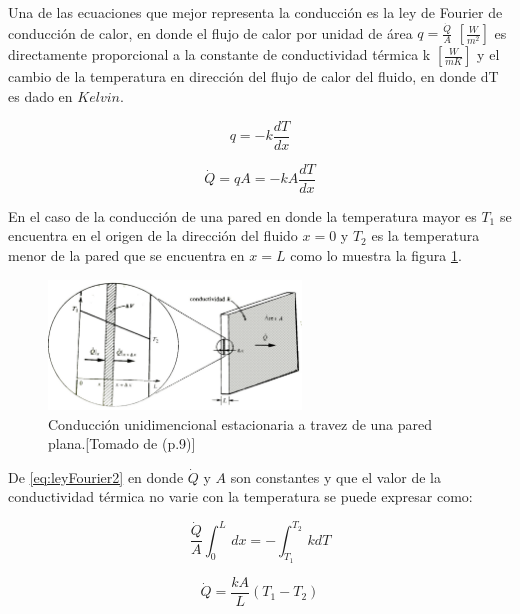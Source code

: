\documentclass[12pt,letterpaper]{article}     %
\begin{document}
Una de las ecuaciones que mejor representa la conducción es la ley de Fourier de conducción de calor, en donde el flujo de calor por unidad de área $q = \frac{\dot{Q}}{A}$ $[\frac{W}{m^2}]$ es directamente proporcional a la constante de conductividad térmica k $[\frac{W}{mK}]$ y el cambio de la temperatura en dirección del flujo de calor del fluido, en donde dT es dado en $Kelvin$. 

\begin{equation}
    q = -k\frac{dT}{dx} 
    \label{eq:leyFourier1}
\end{equation}

\begin{equation}
    \dot{Q} = q A = -k A \frac{dT}{dx} 
    \label{eq:leyFourier2}
\end{equation}

En el caso de la conducción de una pared en donde la temperatura mayor es $T_{1}$ se encuentra en el origen de la dirección del fluido $x=0$ y $T_{2}$ es la temperatura menor de la pared que se encuentra en $x=L$ como lo muestra la figura \ref{fig:cond-paredplana}. 

\begin{figure}[H]
\centering
\includegraphics[width=0.6\textwidth]{Imagines/coduccion1pared-nuevo.jpg}
\caption{Conducción unidimencional estacionaria a travez de una pared plana.[Tomado de \cite{Mills} (p.9)]}
\label{fig:cond-paredplana}
\end{figure}

De \ref{eq:leyFourier2} en donde $\dot{Q}$ y $A$ son constantes y que el valor de la conductividad térmica no varie con la temperatura se puede expresar como:



\begin{equation}
    \frac{\dot{Q}}{A}\displaystyle\int_{0}^{L}\, dx = -\displaystyle\int_{T_{1}}^{T_{2}}\,k dT
    \label{eq:intleyFourier1}
\end{equation}

\begin{equation}
    \dot{Q} = \frac{k A}{L} (T_{1}-T_{2})
    \label{eq:intleyFourier2}
\end{equation}
\end{document}
